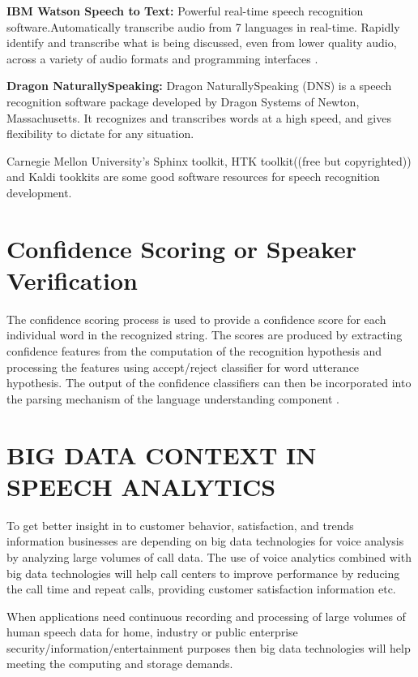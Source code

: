 \documentclass[sigconf]{acmart}
\begin{document}
\textbf{IBM Watson Speech to Text:} Powerful real-time speech recognition software.Automatically transcribe audio from 7 languages in real-time. Rapidly identify and transcribe what is being discussed, even from lower quality audio, across a variety of audio formats and programming interfaces \cite{IBM}. 

\textbf{Dragon NaturallySpeaking:} Dragon NaturallySpeaking (DNS) \cite{Dragon} is a speech recognition software package developed by Dragon Systems of Newton, Massachusetts. It recognizes and transcribes words at a high speed, and gives flexibility to dictate for any situation. 

\par\null\par
Carnegie Mellon University's Sphinx toolkit, HTK toolkit((free but copyrighted)) and Kaldi tookkits are some good software resources for speech recognition development. 

\section{Confidence Scoring or Speaker Verification}
The confidence scoring process is used to provide a confidence score for each individual word in the recognized string. The scores are produced by extracting confidence features from the computation of the recognition hypothesis and processing the features using accept/reject classifier for word utterance hypothesis. The output of the confidence classifiers can then be incorporated into the parsing mechanism of the language understanding component \cite{Hazen2000}. 

\section{BIG DATA CONTEXT IN SPEECH ANALYTICS}
To get better insight in to customer behavior, satisfaction, and trends information businesses are depending on big data technologies for voice analysis by analyzing large volumes of call data. The use of voice analytics combined with big data technologies will help call centers to improve performance by reducing the call time and repeat calls, providing customer satisfaction information etc.

When applications need continuous recording and processing of large volumes of human speech data for home, industry or public enterprise security/information/entertainment purposes then big data technologies will help meeting the computing and storage demands.  
\end{document}
